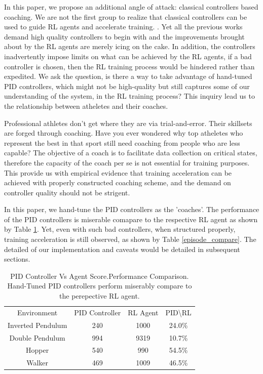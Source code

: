\documentclass[journal]{IEEEtran}
\begin{document}
In this paper, we propose an additional angle of attack: classical controllers based coaching. We are not the first group to realize that classical controllers can be used to guide RL agents and accelerate training. \cite{Xie2018LearningWT}\cite{Carlucho2017IncrementalQS}\cite{Pavse2020RIDMRI}. Yet all the previous works demand high quality controllers to begin with and the improvements brought about by the RL agents are merely icing on the cake. In addition, the controllers inadvertently impose limits on what can be achieved by the RL agents, if a bad controller is chosen, then the RL training process would be hindered rather than expedited. We ask the question, is there a way to take advantage of hand-tuned PID controllers, which might not be high-quality but still captures some of our understanding of the system, in the RL training process? This inquiry lead us to the relationship between atheletes and their coaches.

Professional athletes don't get where they are via trial-and-error. Their skillsets are forged through coaching. Have you ever wondered why top atheletes who represent the best in that sport still need coaching from people who are less capable? The objective of a coach is to facilitate data collection on critical states, therefore the capacity of the coach per se is not essential for training purposes. This provide us with empirical evidence that training acceleration can be achieved with properly constructed coaching scheme, and the demand on controller quality should not be strigent. 

In this paper, we hand-tune the PID controllers as the 'coaches'. The performance of the PID controllers is miserable comapare to the respective RL agent as shown by Table \ref{score_compare}. Yet, even with such bad controllers, when structured properly, training acceleration is still observed, as shown by Table \ref{episode_compare}. The detailed of our implementation and caveats would be detailed in subsequent sections.



\begin{table}
\footnotesize
\caption{PID Controller Vs Agent Score.Performance Comparison. Hand-Tuned PID controllers perform miserably compare to the perepective RL agent.}
\label{score_compare}
\centering
\begin{tabular}{ cccc }
\rowcolor{airforceblue}
Environment &   PID Controller &RL Agent &PID\textbackslash RL \\
Inverted Pendulum &  240 & 1000&  24.0\%\\
\rowcolor{beaublue}

Double Pendulum &  994 & 9319& 10.7\%\\

Hopper &  540 & 990& 54.5\%\\
\rowcolor{beaublue}
Walker &  469 & 1009& 46.5\%\\
\end{tabular}
\end{table}
\end{document}
